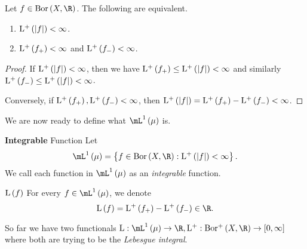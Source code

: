 \documentclass[pmath450]{subfiles}
\begin{document}
    \begin{lemma}{}
        Let $f\in\bor\left( X,\R \right)$. The following are equivalent.
        \begin{enumerate}
            \item $\operatorname{L^+}\left( \left| f \right| \right) < \infty$.
            \item $\operatorname{L^+}\left( f_+ \right)<\infty$ and $\operatorname{L^+}\left( f_- \right)<\infty$.
        \end{enumerate}
    \end{lemma}

    \begin{proof}
        If $\operatorname{L^+}\left( \left| f \right| \right)<\infty$, then we have $\operatorname{L^+}\left( f_+ \right)\leq\operatorname{L^+}\left( \left| f \right| \right)<\infty$ and similarly $\operatorname{L^+}\left( f_- \right)\leq\operatorname{L^+}\left( \left| f \right| \right)<\infty$. 

        Conversely, if $\operatorname{L^+}\left( f_+ \right),\operatorname{L^+}\left( f_- \right)<\infty$, then $\operatorname{L^+}\left( \left| f \right| \right)=\operatorname{L^+}\left( f_+ \right)-\operatorname{L^+}\left( f_- \right)<\infty$.
    \end{proof}
    
    \np We are now ready to define what $\lone\left( \mu \right)$ is.

    \begin{definition}{\textbf{Integrable} Function}
        Let
        \begin{equation*}
            \lone\left( \mu \right) = \left\lbrace f\in\bor\left( X,\R \right): \lplus\left( \left| f \right| \right)<\infty \right\rbrace.
        \end{equation*}
        We call each function in $\lone\left( \mu \right)$ as an \emph{integrable} function.
    \end{definition}

    \begin{notation}{$\operatorname{L}\left( f \right)$}
        For every $f\in\lone\left( \mu \right)$, we denote
        \begin{equation*}
            \lbor\left( f \right) = \lplus\left( f_+ \right)-\lplus\left( f_- \right)\in\R.
        \end{equation*}
    \end{notation}

    \np So far we have two functionals $\lbor:\lone\left( \mu \right)\to\R, \lplus:\borplus\left( X,\R \right)\to\left[ 0,\infty \right]$ where both are trying to be the \textit{Lebesgue integral}. 
\end{document}

